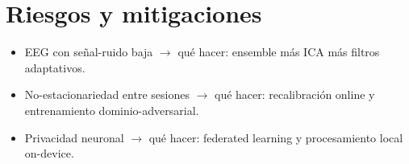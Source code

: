 \section{Riesgos y mitigaciones}

\begin{itemize}
\item[•] EEG con señal-ruido baja $\rightarrow$ qué hacer:  ensemble más ICA más filtros 
adaptativos.
\item[•] No-estacionariedad entre sesiones $\rightarrow$ qué hacer: recalibración online y 
entrenamiento dominio-adversarial.
\item[•] Privacidad neuronal $\rightarrow$ qué hacer: federated learning y procesamiento local 
on-device.
\end{itemize}

\afterpage{\blankpage}

